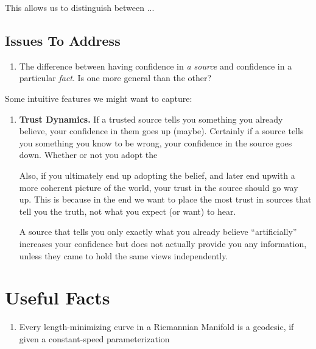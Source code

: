 \documentclass{article}
\begin{document}
This allows us to distinguish between ...
%

%
%


\subsection*{Issues To Address}
\begin{enumerate}
    \item The difference between having confidence in \emph{a source} and confidence in a particular \emph{fact}.  Is one more general than the other?
\end{enumerate}

Some intuitive features we might want to capture:
\begin{enumerate}

    \item \textbf{Trust Dynamics.} If a trusted source tells you something you already believe, your confidence in them goes up (maybe). Certainly if a source tells you something you know to be wrong, your confidence in the source goes down.  Whether or not you adopt the

    Also, if you ultimately end up adopting the belief, and later end upwith a more coherent picture of the world, your trust in the source should go way up.
    This is because in the end we want to place the most trust in sources that tell you the truth, not what you expect (or want) to hear.

    A source that tells you only exactly what you already believe ``artificially'' increases your confidence but does not actually provide you any information, unless they came to hold the same views independently.

\end{enumerate}

\TODO
\clearpage

\section{Useful Facts}
\begin{enumerate}
    \item Every length-minimizing curve in a Riemannian Manifold is a geodesic, if given a constant-speed parameterization
\end{enumerate}
\end{document}
